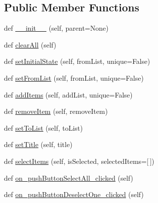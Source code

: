 \subsection*{Public Member Functions}
\begin{DoxyCompactItemize}
\item 
def \mbox{\hyperlink{class_dsg_tools_1_1_custom_widgets_1_1custom_selector_1_1_custom_selector_a162d7bb51351b7b68981cd053b6679b6}{\+\_\+\+\_\+init\+\_\+\+\_\+}} (self, parent=None)
\item 
def \mbox{\hyperlink{class_dsg_tools_1_1_custom_widgets_1_1custom_selector_1_1_custom_selector_a7a295acad141e876019904a825e07578}{clear\+All}} (self)
\item 
def \mbox{\hyperlink{class_dsg_tools_1_1_custom_widgets_1_1custom_selector_1_1_custom_selector_aac11f7aaf31b6f965064f1c763820a6d}{set\+Initial\+State}} (self, from\+List, unique=False)
\item 
def \mbox{\hyperlink{class_dsg_tools_1_1_custom_widgets_1_1custom_selector_1_1_custom_selector_a77a4ce1e5aa57b36c4ae1fada66a1259}{set\+From\+List}} (self, from\+List, unique=False)
\item 
def \mbox{\hyperlink{class_dsg_tools_1_1_custom_widgets_1_1custom_selector_1_1_custom_selector_a31840937788f429b5316cf302c0f0b0d}{add\+Items}} (self, add\+List, unique=False)
\item 
def \mbox{\hyperlink{class_dsg_tools_1_1_custom_widgets_1_1custom_selector_1_1_custom_selector_a33075741d64eaae52615c41430ab31a8}{remove\+Item}} (self, remove\+Item)
\item 
def \mbox{\hyperlink{class_dsg_tools_1_1_custom_widgets_1_1custom_selector_1_1_custom_selector_a4c61d9303e0a18cdb81d2d0a845cf4d6}{set\+To\+List}} (self, to\+List)
\item 
def \mbox{\hyperlink{class_dsg_tools_1_1_custom_widgets_1_1custom_selector_1_1_custom_selector_af2924a39b139ecacdb4af5e9414b9d0e}{set\+Title}} (self, title)
\item 
def \mbox{\hyperlink{class_dsg_tools_1_1_custom_widgets_1_1custom_selector_1_1_custom_selector_a5e5a67a15cfa5b54b154bdbb727b4afd}{select\+Items}} (self, is\+Selected, selected\+Items=\mbox{[}$\,$\mbox{]})
\item 
def \mbox{\hyperlink{class_dsg_tools_1_1_custom_widgets_1_1custom_selector_1_1_custom_selector_a42c18f0f3b29b1ce38e402cf7ce40613}{on\+\_\+push\+Button\+Select\+All\+\_\+clicked}} (self)
\item 
def \mbox{\hyperlink{class_dsg_tools_1_1_custom_widgets_1_1custom_selector_1_1_custom_selector_a3d4821fa30f10fc4715fdff0a0310ad7}{on\+\_\+push\+Button\+Deselect\+One\+\_\+clicked}} (self)

\end{DoxyCompactItemize}
